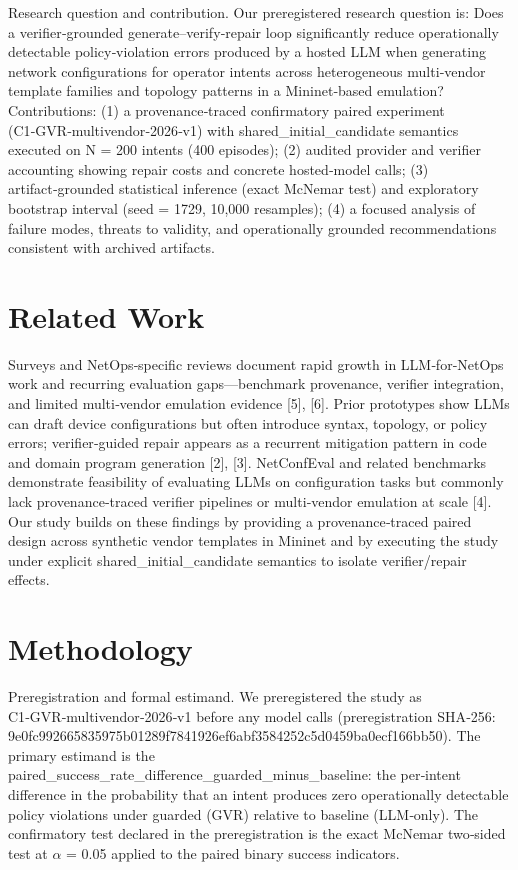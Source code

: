 \documentclass[conference]{IEEEtran}
\begin{document}
Research question and contribution. Our preregistered research question is: Does a verifier‑grounded generate--verify‑repair loop significantly reduce operationally detectable policy‑violation errors produced by a hosted LLM when generating network configurations for operator intents across heterogeneous multi‑vendor template families and topology patterns in a Mininet‑based emulation? Contributions: (1) a provenance‑traced confirmatory paired experiment (C1‑GVR‑multivendor‑2026‑v1) with shared\_initial\_candidate semantics executed on N = 200 intents (400 episodes); (2) audited provider and verifier accounting showing repair costs and concrete hosted‑model calls; (3) artifact‑grounded statistical inference (exact McNemar test) and exploratory bootstrap interval (seed = 1729, 10,000 resamples); (4) a focused analysis of failure modes, threats to validity, and operationally grounded recommendations consistent with archived artifacts.

\section{Related Work}
Surveys and NetOps‑specific reviews document rapid growth in LLM‑for‑NetOps work and recurring evaluation gaps---benchmark provenance, verifier integration, and limited multi‑vendor emulation evidence [5], [6]. Prior prototypes show LLMs can draft device configurations but often introduce syntax, topology, or policy errors; verifier‑guided repair appears as a recurrent mitigation pattern in code and domain program generation [2], [3]. NetConfEval and related benchmarks demonstrate feasibility of evaluating LLMs on configuration tasks but commonly lack provenance‑traced verifier pipelines or multi‑vendor emulation at scale [4]. Our study builds on these findings by providing a provenance‑traced paired design across synthetic vendor templates in Mininet and by executing the study under explicit shared\_initial\_candidate semantics to isolate verifier/repair effects.

\section{Methodology}
Preregistration and formal estimand. We preregistered the study as C1‑GVR‑multivendor‑2026‑v1 before any model calls (preregistration SHA‑256: 9e0fc992\allowbreak{}66583597\allowbreak{}5b01289f\allowbreak{}7841926e\allowbreak{}f6abf358\allowbreak{}4252c5d0\allowbreak{}459ba0ec\allowbreak{}f166bb50). The primary estimand is the paired\_success\_rate\_difference\_guarded\_minus\_baseline: the per‑intent difference in the probability that an intent produces zero operationally detectable policy violations under guarded (GVR) relative to baseline (LLM‑only). The confirmatory test declared in the preregistration is the exact McNemar two‑sided test at \ensuremath{\alpha} = 0.05 applied to the paired binary success indicators.
\end{document}
